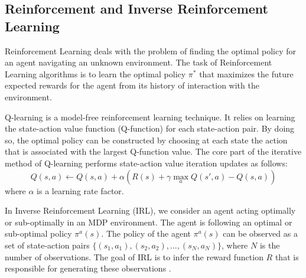 \documentclass[letterpaper, 10 pt, conference]{ieeeconf}  %
\newcommand\NB[1]{$\spadesuit$\footnote{NB: #1}}
\begin{document}
\subsection{Reinforcement and Inverse Reinforcement Learning}
Reinforcement Learning deals with the problem of finding the optimal policy for an agent navigating an unknown environment. 
The task of Reinforcement Learning algorithms is to learn the optimal policy $\pi^*$ that maximizes the future expected rewards for the agent from its history of interaction with the environment. 

Q-learning is a model-free reinforcement learning technique. It relies on learning the state-action value function (Q-function) for each state-action pair. By doing so, the optimal policy can be constructed by choosing at each state the action that is associated with the largest Q-function value. The core part of the iterative method of Q-learning performs state-action value iteration updates as follows:%
\begin{equation}\label{eq:qlearn}
    Q(s,a) \leftarrow Q(s,a) + \alpha ( R(s) + \gamma \max_{a} Q(s',a) - Q(s,a))
\end{equation}
where $\alpha$ is a learning rate factor.

In Inverse Reinforcement Learning (IRL), we consider an agent acting optimally or sub-optimally in an MDP environment. The agent is following an optimal or sub-optimal policy $\pi^a(s)$. The policy of the agent $\pi^a(s)$ can be observed as a set of state-action pairs $\{(s_1,a_1),(s_2,a_2), ...,(s_N,a_N)\}$, where $N$ is the number of observations. The goal of IRL is to infer the reward function $R$ that is responsible for generating these observations \cite{ng2000algorithms}.%
\end{document}
